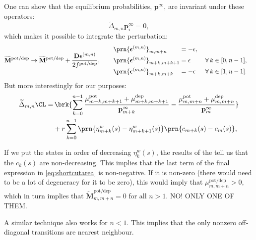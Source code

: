 \documentclass[12pt]{article}
\newcommand{\pr}{\mathbf{p}}
\newcommand{\eq}{\pr^\infty}
\newcommand{\D}{\mathbf{D}}
\newcommand{\M}{\mathbf{M}}
\newcommand{\pot}{^{\text{pot}}}
\newcommand{\dep}{^{\text{dep}}}
\newcommand{\potdep}{^{\text{pot/dep}}}
\newcommand{\Mh}{\widetilde{\M}}
\begin{document}
One can show that the equilibrium probabilities, $\eq$, are invariant under these operators:
%
\begin{equation}\label{eq:shortcutprob}
  \widetilde{\Delta}_{m,n} \eq_i = 0,
\end{equation}
%
which makes it possible to integrate the perturbation:
%
\begin{equation}\label{eq:shortcutfinite}
  \Mh\potdep \to \Mh\potdep + \frac{\D\boldsymbol{\epsilon}^{(m,n)}}{2f\potdep},
  \qquad
  \begin{aligned}
    &\prn{\boldsymbol{\epsilon}^{(m,n)}}_{m,m+n}
      &\!\!\!\!\!\!&= -\epsilon,\\
    &\prn{\boldsymbol{\epsilon}^{(m,n)}}_{m+k,m+k+1}
      &\!\!\!\!\!\!&= \epsilon
        &\;
        &\forall\, k \in [0,n-1],\\
    &\prn{\boldsymbol{\epsilon}^{(m,n)}}_{m+k,m+k}
      &\!\!\!\!\!\!&= -\epsilon
        &
        &\forall\, k \in [1,n-1].
  \end{aligned}
\end{equation}
%
But more interestingly for our purposes:
%
\begin{equation}\label{eq:shortcutarea}
\begin{aligned}
    \widetilde{\Delta}_{m,n}\CL =& \,
      \brk{ \sum_{k=0}^{n-1} \frac{\mu\pot_{m+k,m+k+1}+\mu\dep_{m+k,m+k+1}}{\eq_{m+k}}
      - \frac{\mu\pot_{m,m+n}+\mu\dep_{m,m+n}}{\eq_m}} \\
      &+ r \sum_{k=0}^{n-1} \prn{\eta^w_{m+k}(s) - \eta^w_{m+k+1}(s)} \prn{c_{m+k}(s) - c_{m}(s)},
\end{aligned}
\end{equation}
%

If we put the states in order of decreasing $\eta^w_k(s)$, the results of the  tell us that the $c_k(s)$ are non-decreasing.
This implies that the last term of the final expression in \eqref{eq:shortcutarea} is non-negative.
If it is non-zero (there would need to be a lot of degeneracy for it to be zero), this would imply that $\mu\potdep_{m,m+n}>0$, which in turn implies that $\Mh\potdep_{m,m+n}=0$ for all $n>1$. NO! ONLY ONE OF THEM.

A similar technique also works for $n<1$.
This implies that the only nonzero off-diagonal transitions are nearest neighbour.









\end{document}
